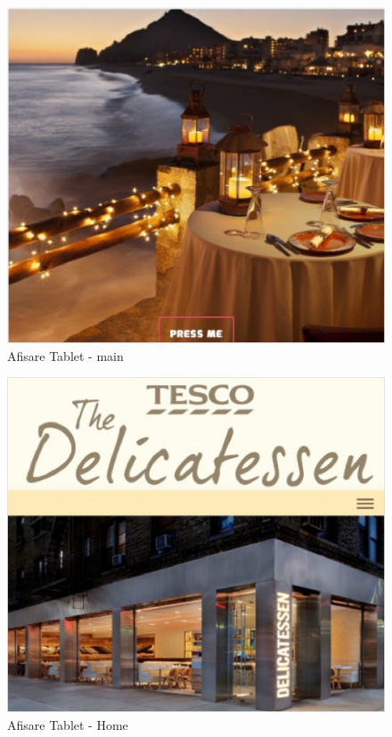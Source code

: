 \documentclass[11pt]{article}
\begin{document}
\begin{figure}[h]
\includegraphics{images/11.eps}
\caption{Afisare Tablet - main}
\end{figure}

\begin{figure}[h]
\includegraphics{images/12.eps}
\caption{Afisare Tablet - Home}
\end{figure}
\end{document}
